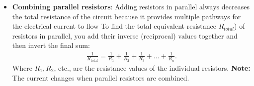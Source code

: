 \documentclass{report}
\begin{document}
\begin{itemize}
\begin{itemize}
                    \begin{align*}
                        \text{Total\ Voltage}=\text{Parallel\ Group\ Voltage}+\text{Series\ Component\ Voltage}
                    .\end{align*}
            \end{itemize}
        \item \textbf{Combining parallel resistors}: Adding resistors in parallel always decreases the total resistance of the circuit because it provides multiple pathways for the electrical current to flow
            \bigbreak \noindent 
            To find the total equivalent resistance \(R_{total}\)) of resistors in parallel, you add their inverse (reciprocal) values together and then invert the final sum:
            \begin{align*}
               \frac{1}{R_{\text{total}}}  = \frac{1}{R_{1}} + \frac{1}{R_{2}} + \frac{1}{R_{3}} + \ldots + \frac{1}{R_{n}}
            .\end{align*}
            Where $R_{1}, R_{2}$, etc., are the resistance values of the individual resistors.
            \bigbreak \noindent 
            \textbf{Note:} The current changes when parallel resistors are combined.

    \end{itemize}
\end{document}
